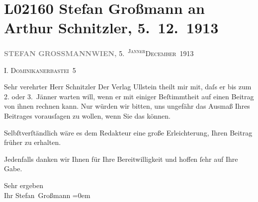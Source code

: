 

\section[Stefan Großmann an Arthur Schnitzler, 5. 12. 1913]{L02160 Stefan Großmann an Arthur Schnitzler, 5. 12. 1913}
\nopagebreak{}
\rehead{ }\normalsize\beginnumbering{}
\toendnotes[C]{\smallbreak\pagebreak[2]}
\pstart
           {\pb}\textcolor{gray}{\textbf{STEFAN GROSSMANN}}\hfill \textcolor{gray}{\textbf{WIEN,}}{ }5. \substVorne{}\textsuperscript{\textsc{Janner}}\substDazwischen{}\textsc{December}\substHinten{} 1913\pend
           
\pstart
           \raggedleft{}I. \textsc{Dominikanerbastei} 5\pend
           
\pstart\center{}Sehr verehrter Herr Schnitzler\pend\vspace{0.5em}
\pstart
           Der Verlag Ullstein theilt mir mit, daſs er bis
               zum 2. oder 3. Jänner warten will, wenn er mit einiger
               Beſtimmtheit auf einen Beitrag von ihnen rechnen kann. Nur würden wir bitten, uns
               ungefähr das Ausmaß Ihres Beitrages vorausſagen zu wollen, wenn Sie das können.\pend
           
\pstart
           Selbſtverſtändlich wäre es dem Redakteur eine große Erleichterung, Ihren Beitrag
               früher zu erhalten.\pend
           
\pstart
           Jedenfalls danken wir Ihnen für Ihre Bereitwilligkeit und hoffen ſehr auf Ihre
               Gabe.\pend
           
\pstart
           Sehr ergeben{\\[\baselineskip]} Ihr \spacefill\mbox{Stefan Großmann}\pend
           \leftskip=0em{}\endnumbering{}  
      